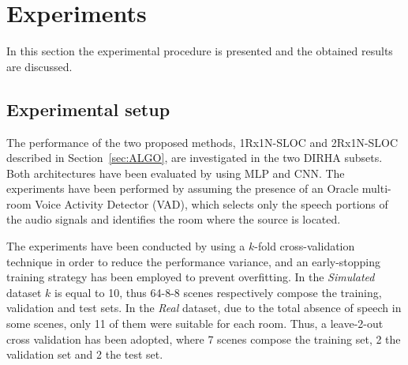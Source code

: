 \documentclass[review]{elsarticle}
\newcommand{\secref}[1]{Section~\ref{#1}}
\begin{document}
\begin{table}[t]
	\centering
	\caption{Main differences between the Real and Simulated subsets.}
	\label{tab:dataset}
\end{table}


\section{Experiments}
\label{sec:expRes}
In this section the experimental procedure is presented and the obtained results are discussed. 

\subsection{Experimental setup}
The performance of the two proposed methods, 1Rx1N-SLOC and 2Rx1N-SLOC described in \secref{sec:ALGO}, are investigated in the two DIRHA subsets.
Both architectures have been evaluated by using MLP and CNN. The experiments have been performed by assuming the presence of an Oracle multi-room Voice Activity Detector (VAD), which selects only the speech portions of the audio signals and identifies the room where the source is located.

The experiments have been conducted by using a $k$-fold cross-validation technique in order to reduce the performance variance, and an early-stopping training strategy has been employed to prevent overfitting. In the \textit{Simulated} dataset $k$ is equal to 10, thus 64-8-8 scenes respectively compose the training, validation and test sets. In the \textit{Real} dataset, due to the total absence of speech in some scenes, only 11 of them were suitable for each room. Thus, a leave-2-out cross validation has been adopted, where 7 scenes compose the training set, 2 the validation set and 2 the test set.
\end{document}
